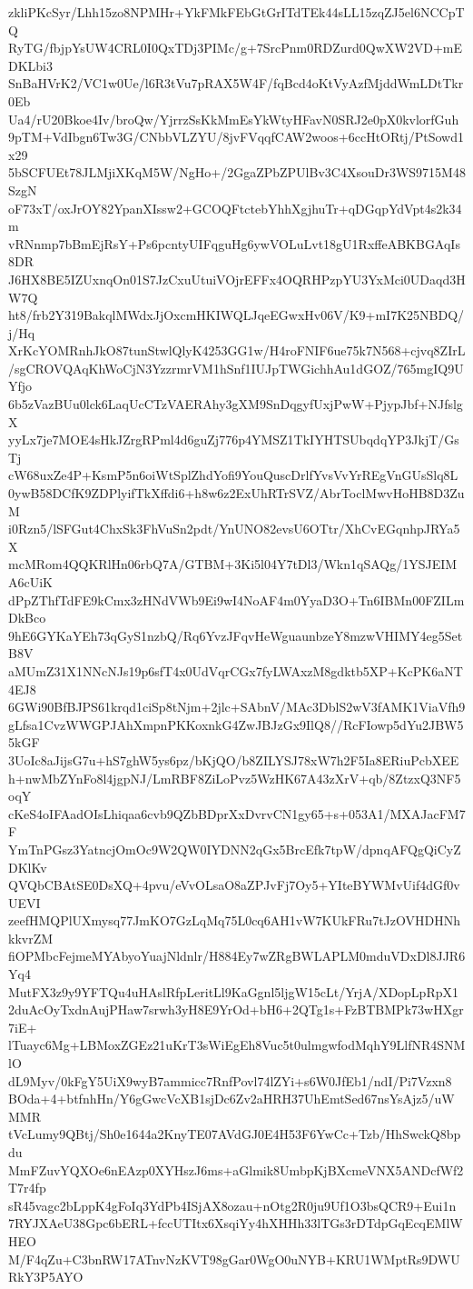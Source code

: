 zkliPKcSyr/Lhh15zo8NPMHr+YkFMkFEbGtGrITdTEk44sLL15zqZJ5el6NCCpTQ
RyTG/fbjpYsUW4CRL0I0QxTDj3PIMc/g+7SrcPnm0RDZurd0QwXW2VD+mEDKLbi3
SnBaHVrK2/VC1w0Ue/l6R3tVu7pRAX5W4F/fqBcd4oKtVyAzfMjddWmLDtTkr0Eb
Ua4/rU20Bkoe4Iv/broQw/YjrrzSsKkMmEsYkWtyHFavN0SRJ2e0pX0kvlorfGuh
9pTM+VdIbgn6Tw3G/CNbbVLZYU/8jvFVqqfCAW2woos+6ccHtORtj/PtSowd1x29
5bSCFUEt78JLMjiXKqM5W/NgHo+/2GgaZPbZPUlBv3C4XsouDr3WS9715M48SzgN
oF73xT/oxJrOY82YpanXIssw2+GCOQFtctebYhhXgjhuTr+qDGqpYdVpt4s2k34m
vRNnmp7bBmEjRsY+Ps6pcntyUIFqguHg6ywVOLuLvt18gU1RxffeABKBGAqIs8DR
J6HX8BE5IZUxnqOn01S7JzCxuUtuiVOjrEFFx4OQRHPzpYU3YxMci0UDaqd3HW7Q
ht8/frb2Y319BakqlMWdxJjOxcmHKIWQLJqeEGwxHv06V/K9+mI7K25NBDQ/j/Hq
XrKcYOMRnhJkO87tunStwlQlyK4253GG1w/H4roFNIF6ue75k7N568+cjvq8ZIrL
/sgCROVQAqKhWoCjN3YzzrmrVM1hSnf1IUJpTWGichhAu1dGOZ/765mgIQ9UYfjo
6b5zVazBUu0lck6LaqUcCTzVAERAhy3gXM9SnDqgyfUxjPwW+PjypJbf+NJfslgX
yyLx7je7MOE4sHkJZrgRPml4d6guZj776p4YMSZ1TkIYHTSUbqdqYP3JkjT/GsTj
cW68uxZe4P+KsmP5n6oiWtSplZhdYofi9YouQuscDrlfYvsVvYrREgVnGUsSlq8L
0ywB58DCfK9ZDPlyifTkXffdi6+h8w6z2ExUhRTrSVZ/AbrToclMwvHoHB8D3ZuM
i0Rzn5/lSFGut4ChxSk3FhVuSn2pdt/YnUNO82evsU6OTtr/XhCvEGqnhpJRYa5X
mcMRom4QQKRlHn06rbQ7A/GTBM+3Ki5l04Y7tDl3/Wkn1qSAQg/1YSJEIMA6cUiK
dPpZThfTdFE9kCmx3zHNdVWb9Ei9wI4NoAF4m0YyaD3O+Tn6IBMn00FZILmDkBco
9hE6GYKaYEh73qGyS1nzbQ/Rq6YvzJFqvHeWguaunbzeY8mzwVHIMY4eg5SetB8V
aMUmZ31X1NNcNJs19p6sfT4x0UdVqrCGx7fyLWAxzM8gdktb5XP+KcPK6aNT4EJ8
6GWi90BfBJPS61krqd1ciSp8tNjm+2jlc+SAbnV/MAc3DblS2wV3fAMK1ViaVfh9
gLfsa1CvzWWGPJAhXmpnPKKoxnkG4ZwJBJzGx9IlQ8//RcFIowp5dYu2JBW55kGF
3UoIc8aJijsG7u+hS7ghW5ys6pz/bKjQO/b8ZILYSJ78xW7h2F5Ia8ERiuPcbXEE
h+nwMbZYnFo8l4jgpNJ/LmRBF8ZiLoPvz5WzHK67A43zXrV+qb/8ZtzxQ3NF5oqY
cKeS4oIFAadOIsLhiqaa6cvb9QZbBDprXxDvrvCN1gy65+s+053A1/MXAJacFM7F
YmTnPGsz3YatncjOmOc9W2QW0IYDNN2qGx5BrcEfk7tpW/dpnqAFQgQiCyZDKlKv
QVQbCBAtSE0DsXQ+4pvu/eVvOLsaO8aZPJvFj7Oy5+YIteBYWMvUif4dGf0vUEVI
zeefHMQPlUXmysq77JmKO7GzLqMq75L0cq6AH1vW7KUkFRu7tJzOVHDHNhkkvrZM
fiOPMbcFejmeMYAbyoYuajNldnlr/H884Ey7wZRgBWLAPLM0mduVDxDl8JJR6Yq4
MutFX3z9y9YFTQu4uHAslRfpLeritLl9KaGgnl5ljgW15cLt/YrjA/XDopLpRpX1
2duAcOyTxdnAujPHaw7srwh3yH8E9YrOd+bH6+2QTg1s+FzBTBMPk73wHXgr7iE+
lTuayc6Mg+LBMoxZGEz21uKrT3sWiEgEh8Vuc5t0ulmgwfodMqhY9LlfNR4SNMlO
dL9Myv/0kFgY5UiX9wyB7ammicc7RnfPovl74lZYi+s6W0JfEb1/ndI/Pi7Vzxn8
BOda+4+btfnhHn/Y6gGwcVcXB1sjDc6Zv2aHRH37UhEmtSed67nsYsAjz5/uWMMR
tVcLumy9QBtj/Sh0e1644a2KnyTE07AVdGJ0E4H53F6YwCc+Tzb/HhSwckQ8bpdu
MmFZuvYQXOe6nEAzp0XYHszJ6ms+aGlmik8UmbpKjBXcmeVNX5ANDcfWf2T7r4fp
sR45vagc2bLppK4gFoIq3YdPb4ISjAX8ozau+nOtg2R0ju9Uf1O3bsQCR9+Eui1n
7RYJXAeU38Gpc6bERL+fccUTItx6XsqiYy4hXHHh33lTGs3rDTdpGqEcqEMlWHEO
M/F4qZu+C3bnRW17ATnvNzKVT98gGar0WgO0uNYB+KRU1WMptRs9DWURkY3P5AYO

